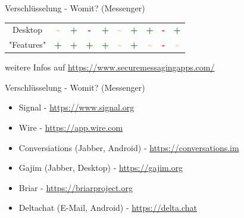 \documentclass{beamer}
\begin{document}
\begin{frame}{Verschlüsselung - Womit? (Messenger)}
\begin{tabular}{c|ccccccccc}
        {\small Desktop} & \textcolor{orange}{\bf\Huge\textasciitilde} & \textcolor{green}{\bf\Huge+} & \textcolor{red}{\bf\Huge-} & \textcolor{green}{\bf\Huge+} & \textcolor{orange}{\bf\Huge\textasciitilde} & \textcolor{green}{\bf\Huge+} & \textcolor{green}{\bf\Huge+} & \textcolor{red}{\bf\Huge-} & \textcolor{green}{\bf\Huge+} \\
        {\small "Features"} & \textcolor{green}{\bf\Huge+} & \textcolor{green}{\bf\Huge+} & \textcolor{green}{\bf\Huge+} & \textcolor{green}{\bf\Huge+} & \textcolor{orange}{\bf\Huge\textasciitilde} & \textcolor{green}{\bf\Huge+} & \textcolor{orange}{\bf\Huge\textasciitilde} & \textcolor{red}{\bf\Huge-} & \textcolor{orange}{\bf\Huge\textasciitilde} \\
    \end{tabular}
	
	\hspace{2cm}
	\tiny{weitere Infos auf \url{https://www.securemessagingapps.com/}}
\end{frame}

\begin{frame}{Verschlüsselung - Womit? (Messenger)}
    \begin{itemize}
        \item Signal - \url{https://www.signal.org}
        \item Wire - \url{https://app.wire.com}
        \item Conversiations (Jabber, Android) - \url{https://conversations.im}
        \item Gajim (Jabber, Desktop) - \url{https://gajim.org}
        \item Briar - \url{https://briarproject.org}
        \item Deltachat (E-Mail, Android) - \url{https://delta.chat}
    \end{itemize}
\end{frame}
\end{document}
